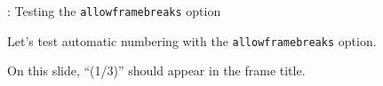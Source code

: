 \begin{frame}[allowframebreaks]{\titleprefix: Testing the \texttt{allowframebreaks} option}

\renewcommand{\blindmarkup}[1]{\emph{#1}}

Let's test automatic numbering with the \texttt{allowframebreaks} option.

On this slide, ``(1/3)'' should appear in the frame title.

\blindtext

\parstart{\framebreak}
\Blindtext[2]

\end{frame}






\section{\refname}


\begin{frame}[allowframebreaks]{\insertsection}
	
	
	
	
\end{frame}






